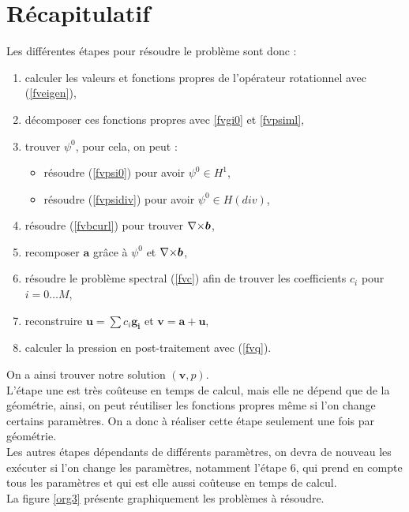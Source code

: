 \chapter{Récapitulatif}

Les différentes étapes pour résoudre le problème sont donc :
\begin{enumerate}
\item calculer les valeurs et fonctions propres de l'opérateur rotationnel avec (\ref{fveigen}),
\item décomposer ces fonctions propres avec \ref{fvgi0} et \ref{fvpsiml},
\item trouver $\psi^0$, pour cela, on peut :
\begin{itemize}
\item résoudre (\ref{fvpsi0}) pour avoir $\psi^0\in H^1$,
\item résoudre (\ref{fvpsidiv}) pour avoir $\psi^0\in H(div)$,
\end{itemize}
\item résoudre (\ref{fvbcurl}) pour trouver ${\nabla\times}\bm{b}$,
\item recomposer $\bm{a}$ grâce à $\psi^0$ et ${\nabla\times}\bm{b}$,
\item résoudre le problème spectral (\ref{fvc}) afin de trouver les coefficients $c_i$ pour $i=0\dots M$,
\item reconstruire $\bm{u}=\sum c_i \bm{g_i}$ et $\bm{v}=\bm{a}+\bm{u}$,
\item calculer la pression en post-traitement avec (\ref{fvq}).
\end{enumerate}

On a ainsi trouver notre solution $(\mathbf{v},p)$.\\
L'étape une est très coûteuse en temps de calcul, mais elle ne dépend que de la géométrie, ainsi, on peut réutiliser les fonctions propres même si l'on change certains paramètres. On a donc à réaliser cette étape seulement une fois par géométrie.\\
Les autres étapes dépendants de différents paramètres, on devra de nouveau les exécuter si l'on change les paramètres, notamment l'étape 6, qui prend en compte tous les paramètres et qui est elle aussi coûteuse en temps de calcul.\\

La figure \ref{org3} présente graphiquement les problèmes à résoudre.\\


